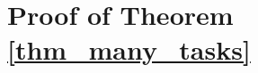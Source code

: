 \documentclass[aos,preprint]{imsart}
\begin{document}

\section{Proof of Theorem \ref{thm_many_tasks}}\label{app_proof_error_same_cov}
\end{document}
